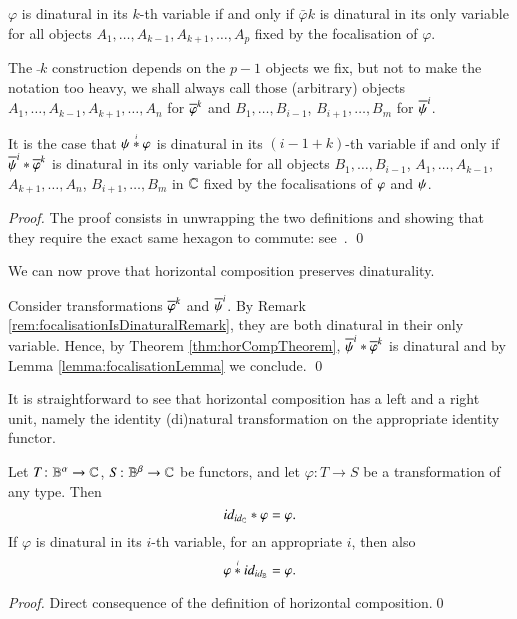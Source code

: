 \begin{remark}\label{rem:focalisationIsDinaturalRemark}
    $\varphi$ is dinatural in its $k$-th variable if and only if $\bar \varphi k$ is dinatural in its only variable for all objects $A_1,\dots,A_{k-1},A_{k+1},\dots,A_p$ fixed by the focalisation of $\varphi$.
\end{remark}

The $\bar{} k$ construction depends on the $p-1$ objects we fix, but not to make the notation too heavy, we shall always call those (arbitrary) objects $A_1,\dots,A_{k-1},A_{k+1},\dots,A_n$ for $\bar \fst k$ and $B_1,\dots,B_{i-1}$, $B_{i+1},\dots,B_m$ for $\bar \snd i$.

\begin{lemma}\label{lemma:focalisationLemma}
    It is the case that $\HC \fst \snd i$ is dinatural in its $(i-1+k)$-th variable if and only if $\hc {\bar \fst k} {\bar \snd i}$ is dinatural in its only variable for all objects $B_1,\dots,B_{i-1}$, $A_1,\dots,A_{k-1}$, $A_{k+1},\dots,A_n$, $B_{i+1},\dots,B_m$ in $\mathbb C$ fixed by the focalisations of $\fst$ and $\psi$.
\end{lemma}
\begin{proof}
    The proof consists in unwrapping the two definitions and showing that they require the exact same hexagon to commute: see~\cite[Lemma 2.14]{santamaria_towards_2019}. \qed
\end{proof}

We can now prove that horizontal composition preserves dinaturality.

\begin{proofDinTheorem}
    Consider transformations $\bar \fst k$ and $\bar \snd i$. By Remark \ref{rem:focalisationIsDinaturalRemark}, they are both dinatural in their only variable. Hence, by Theorem \ref{thm:horCompTheorem}, $\hc {\bar \fst k} {\bar \snd i}$ is dinatural and by Lemma \ref{lemma:focalisationLemma} we conclude. \qed
\end{proofDinTheorem}

It is straightforward to see that horizontal composition has a left and a right unit, namely the identity (di)natural transformation on the appropriate identity functor. 

\begin{theorem}
    Let $T \colon \mathbb B^\alpha \to \mathbb C$, $S \colon \mathbb B^\beta \to \mathbb C$ be functors, and let $\varphi \colon T \to S$ be a transformation of any type. Then
    \[
    \hc \varphi {\id{\id \C}} = \varphi.
    \]
    If $\varphi$ is dinatural in its $i$-th variable, for an appropriate $i$, then also
    \[
    \HC {\id{\id \B}} \varphi i = \varphi.
    \]
\end{theorem}
\begin{proof}
    Direct consequence of the definition of horizontal composition.\qed
\end{proof}

